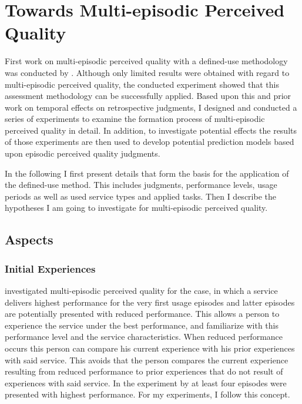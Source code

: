 \chapter{Towards Multi-episodic Perceived Quality}\label{chap:towards}
First work on multi-episodic perceived quality with a defined-use methodology was conducted by \citet{moller_single-call_2011}.
Although only limited results were obtained with regard to multi-episodic perceived quality, the conducted experiment showed that this assessment methodology can be successfully applied.
Based upon this and prior work on temporal effects on retrospective judgments, I designed and conducted a series of experiments to examine the formation process of multi-episodic perceived quality in detail. 
In addition, to investigate potential effects the results of those experiments are then used to develop potential prediction models based upon episodic perceived quality judgments.

In the following I first present details that form the basis for the application of the defined-use method.
This includes judgments, performance levels, usage periods as well as used service types and applied tasks.
Then I describe the hypotheses I am going to investigate for multi-episodic perceived quality.

\section{Aspects}

\subsection{Initial Experiences}
\citet{moller_single-call_2011} investigated multi-episodic perceived quality for the case, in which a service delivers highest performance for the very first usage episodes and latter episodes are potentially presented with reduced performance.
This allows a person to experience the service under the best performance, and familiarize with this performance level and the service characteristics.
When reduced performance occurs this person can compare his current experience with his prior experiences with said service.
This avoids that the person compares the current experience resulting from reduced performance to prior experiences that do not result of experiences with said service.
In the experiment by \citet{moller_single-call_2011} at least four episodes were presented with highest performance.
For my experiments, I follow this concept.

